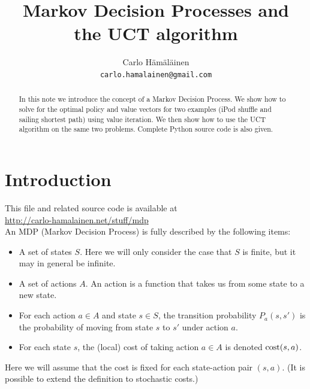 \documentclass[10pt,amstags,fleqn]{article}
\title{Markov Decision Processes and \\the UCT algorithm}
\author{Carlo H\"{a}m\"{a}l\"{a}inen\\
{\texttt{carlo.hamalainen@gmail.com}}}
\theoremstyle{plain}
\theoremstyle{definition}
\theoremstyle{definition}
\begin{document}
\maketitle

\begin{abstract} 
In this note we introduce the concept of a Markov Decision Process. We
show how to solve for the optimal policy and value vectors for two
examples (iPod shuffle and sailing shortest path) using value
iteration. We then show how to use the UCT algorithm on the same two
problems. Complete Python source code is also given.
\end{abstract}

\section{Introduction}

This file and related source code is available at\\
\url{http://carlo-hamalainen.net/stuff/mdp} \\

An MDP (Markov Decision Process) is fully described by the following
items:

\begin{itemize}
\item A set of states $S$. Here we will only consider the case that $S$
is finite, but it may in general be infinite.

\item A set of actions $A$. An action is a function that takes us from
some state to a new state.
\item For each action $a \in A$ and state $s \in S$, the transition
probability $P_a(s,s')$ is the probability of moving from state $s$ to
$s'$ under action $a$.
\item For each state $s$, the (local) cost of taking action $a \in
A$ is denoted $\textnormal{cost}(s,a)$.
\end{itemize}

Here we will assume that the cost is fixed for each state-action pair
$(s,a)$. (It is possible to extend the definition to stochastic costs.)
\end{document}
